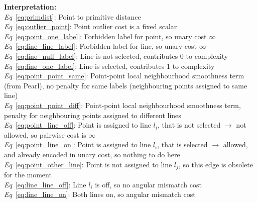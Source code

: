 \documentclass[11pt]{article}
\begin{document}
\par\textbf{Interpretation:}\\
\textit{Eq}~\ref{eq:primdist}: Point to primitive distance \\
\textit{Eq}~\ref{eq:outlier_point}: Point outlier cost is a fixed scalar\\
\textit{Eq}~\ref{eq:point_one_label}: Forbidden label for point, so unary cost $\infty$ \\
\textit{Eq}~\ref{eq:line_line_label}: Forbidden label for line, so unary cost $\infty$ \\
\textit{Eq}~\ref{eq:line_null_label}: Line is not selected, contributes 0 to complexity \\
\textit{Eq}~\ref{eq:line_one_label}: Line is selected, contributes 1 to complexity \\
\textit{Eq}~\ref{eq:point_point_same}: Point-point local neighbourhood smoothness term (from Pearl), no penalty for same labels (neighbouring points assigned to same line)\\
\textit{Eq}~\ref{eq:point_point_diff}: Point-point local neighbourhood smoothness term, penalty for neighbouring points assigned to different lines\\
\textit{Eq}~\ref{eq:point_line_off}: Point is assigned to line $l_i$, that is not selected $\rightarrow$ not allowed, so pairwise cost is $\infty$ \\
\textit{Eq}~\ref{eq:point_line_on}: Point is assigned to line $l_i$, that is selected $\rightarrow$ allowed, and already encoded in unary cost, so nothing to do here \\
\textit{Eq}~\ref{eq:point_other_line}: Point is not assigned to line $l_j$, so this edge is obsolete for the moment \\
\textit{Eq}~\ref{eq:line_line_off}: Line $l_i$ is off, so no angular mismatch cost \\
\textit{Eq}~\ref{eq:line_line_on}: Both lines on, so angular mismatch cost \\
\end{document}

